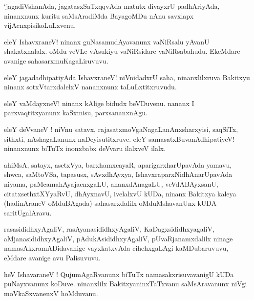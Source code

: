 \documentclass{article}
\begin{document}
\begin{mn}
`jagadiVshanAda, jagatasxSaTxqqvAda matutx divayxrU padhAriyAda, ninanxnunx kuritu saMsAradiMda 
BayagoMDu nAnu savxlapx vijAcnxpisikoLuLxvenu.
\end{mn}

\begin{mn}
eleY IshavxraneV! ninanx guNasamudAyavanunx vaNiRsalu yAvanU shakatxnalalx. oMdu veVLe vAsukiyu 
vaNiRsidare vaNiRsabahudu. EkeMdare avanige sahasarxmuKagaLiruvuvu.
\end{mn}

\begin{mn}
eleY jagadadhipatiyAda IshavxraneV! niVnidadxrU saha, ninanxlilxruva Bakitxyu ninanx 
sotxVtarxdalelxV nananxnunx  taLuLxtitxruvudu.
\end{mn}

\begin{mn}
eleY vaMdayxneV! ninanx kAlige bidudx beVDuvenu. nananx I parxvaqtitxyanunx kaSxmisu, 
parxsananxnAgu.
\end{mn}

\begin{mn}
eleY deVvaneV ! niVnu satavx, rajasatxmoVgaNagaLanAnxsharxyisi, saqSiTx, sithxti, nAshagaLanunx
naDeyisutitxruve. eleY samasatxBuvanAdhipatiyeV! ninanxnunx biTuTx inonxbabx deVvaru ilalxveV ilalx.
\end{mn}

\begin{mn}
ahiMsA, satayx, asetxVya, barxhamxcayaR, aparigarxharUpavAda yamavu, shwca, saMtoVSa, tapasusx, 
sAvxdhAyxya, IshavxraparxNidhAnarUpavAda niyama, paMcamahAyajacnxgaLU, ananxdAnagaLU, 
veVdABAyxsanU, citatxsethxtXYyaRvU, dhAyxnavU, ivelalxvU kUDa, ninanx Bakitxya kaleya 
(hadinAraneV oMduBAgada) sahasarxdalilx oMduMshavanUnx kUDA saritUgalAravu.
\end{mn}

\begin{mn}
rasasididhxyAgaliV, rasAyanasididhxyAgaliV, KaDagxsididhxyagaliV, aMjanasididhxyAgaliV, 
pAdukAsididhxyAgaliV, pUvaRjanamxdalilx ninage namasAkxramADidavanige vayxkatxvAda cihehxgaLAgi 
kaMDubaruvuvu, eMdare avanige avu Palisuvuvu.
\end{mn}

\begin{mn}
heV IshavaraneV ! QujumAgaRvanunx  biTuTx namasakxrisuvavanigU kUDa puNayxvanunx koDuve. 
ninanxlilx BakitxyaninxTaTxvanu saMsAravanunx niVgi moVkaSxvanenxV hoMduvanu.
\end{mn}
\end{document}
